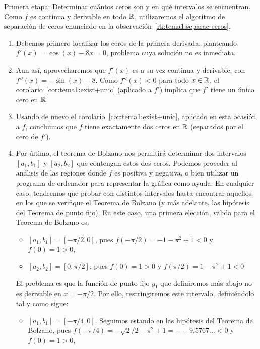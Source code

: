\begin{example}
  \textsf{Primera etapa:} Determinar cuántos ceros son y en qué
  intervalos se encuentran. Como $f$ es continua y derivable en todo
  $\operatorname{{\mathbb R}}$, utilizaremos el algoritmo de separación de ceros enunciado
  en la observación~\ref{rk:tema1:separac-ceros}.
  \begin{enumerate}
  \item Debemos primero localizar los ceros de la primera
    derivada, planteando $f'(x)=\cos(x)-8x=0$, problema cuya solución
    no es inmediata.
  \item Aun así, aprovecharemos que $f'(x)$ es a su vez continua y
    derivable, con $f''(x)=-\sin(x)-8$. Como $f''(x)<0$ para todo
    $x\in\operatorname{{\mathbb R}}$, el corolario~\ref{cor:tema1:exist+unic} (aplicado a
    $f'$) implica que $f'$ tiene un único cero en $\operatorname{{\mathbb R}}$.
  \item Usando de nuevo el
    corolario~\ref{cor:tema1:exist+unic}, aplicado en esta ocasión a
    $f$, concluimos que $f$ tiene exactamente dos ceros en $\operatorname{{\mathbb R}}$
    (separados por el cero de $f'$).
  \item Por último, el teorema de Bolzano nos permitirá determinar dos
    intervalos $[a_1,b_1]$ y $[a_2,b_2]$ que contengan estos dos
    ceros. Podemos proceder al análisis de las regiones donde $f$ es
    positiva y negativa, o bien utilizar un programa de ordenador para
    representar la gráfica como ayuda. En cualquier caso, tendremos
    que probar con distintos intervalos hasta encontrar aquellos en
    los que se verifique el Teorema de Bolzano (y más adelante, las
    hipótesis del Teorema de punto fijo). En este caso, una primera
    elección, válida para el Teorema de Bolzano es:
    \begin{itemize}
    \item $[a_1,b_1]=[-\pi/2, 0]$, pues $f(-\pi/2)=-1-\pi^2+1<0$ y
      $f(0)=1>0$,
    \item $[a_2,b_2]=[0, \pi/2]$, pues $f(0)=1>0$ y $f(\pi/2)= 1-\pi^2+1<0$
    \end{itemize}
    El problema es que la función de punto fijo $g_1$ que definiremos
    más abajo no es derivable en $x=-\pi/2$. Por ello, restringiremos
    este intervalo, definiéndolo tal y como sigue:
    \begin{itemize}
    \item $[a_1,b_1]=[-\pi/4, 0]$. Seguimos estando en las hipótesis
      del Teorema de Bolzano, pues $f(-\pi/4)=
      -\sqrt{2}/2-\pi^2+1=--9.5767...<0$ y $f(0)=1>0$,
    \end{itemize}
  \end{enumerate}


\end{example}
